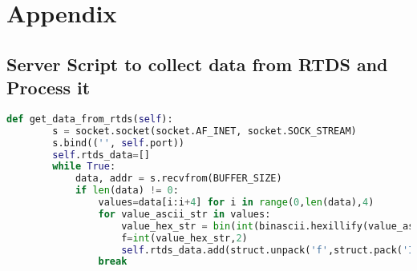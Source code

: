 \chapter{Appendix}
\section{Server Script to collect data from RTDS and Process it}
\begin{lstlisting}[language=python]
def get_data_from_rtds(self):
		s = socket.socket(socket.AF_INET, socket.SOCK_STREAM)
		s.bind(('', self.port))
		self.rtds_data=[]
		while True:
			data, addr = s.recvfrom(BUFFER_SIZE)
			if len(data) != 0:
				values=data[i:i+4] for i in range(0,len(data),4)
				for value_ascii_str in values:
					value_hex_str = bin(int(binascii.hexillify(value_ascii_str),16))
					f=int(value_hex_str,2)
					self.rtds_data.add(struct.unpack('f',struct.pack('I',f))[0])
				break
\end{lstlisting}